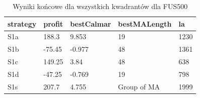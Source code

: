 \newpage
 \begin{table}[t!]
\caption{Wyniki końcowe dla wszystkich kwadrantów dla  FUS500}
 \begin{center} 
 \begin{tabular}{|l|l|l|l|l|} 
 \hline \textbf{strategy} & \textbf{profit} & \textbf{bestCalmar} & \textbf{bestMALength} & \textbf{la} \\ \hline  
S1a & 188.3 & 9.853 & 19 & 1230\\ \hline 
S1b & -75.45 & -0.977 & 48 & 1361\\ \hline 
S1c & 149.25 & 3.84 & 48 & 638\\ \hline 
S1d & -47.25 & -0.769 & 19 & 798\\ \hline 
S1s & 207.7 & 4.755 & Group of MA & 1999\\ 
\hline \end{tabular} 
 \end{center} 
 \end{table}
\FloatBarrier
